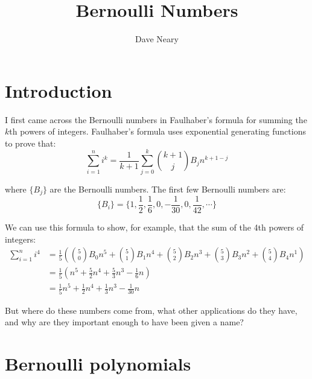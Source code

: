 \documentclass{article}
\begin{document}
\title{Bernoulli Numbers}
\author{Dave Neary}

\maketitle

\section{Introduction}

I first came across the Bernoulli numbers in Faulhaber's formula for summing the $k$th 
powers of integers. Faulhaber's formula uses exponential generating functions to prove that:
\[ \sum_{i=1}^n i^k = \frac{1}{k+1} \sum_{j=0}^k \binom{k+1}{j} B_j n^{k+1-j} \]

where $\{B_j\}$ are the Bernoulli numbers. The first few Bernoulli numbers are:
\[ \{B_i\} = \{1, \frac{1}{2}, \frac{1}{6}, 0, -\frac{1}{30}, 0, \frac{1}{42}, \cdots\} \]

We can use this formula to show, for example, that the sum of the 4th powers of integers:
\begin{align*}
	\sum_{i=1}^n i^4 &= \frac{1}{5}\left( \binom{5}{0} B_0 n^{5} +  \binom{5}{1} B_1 n^{4} +  
	\binom{5}{2} B_2 n^{3} +  \binom{5}{3} B_3 n^{2} +  \binom{5}{4} B_4 n^{1} \right) \\
			 &= \frac{1}{5}\left( n^{5} +  \frac{5}{2} n^{4} +
			 \frac{5}{3} n^{3} -  \frac{1}{6} n  \right) \\
			 &= \frac{1}{5}n^5 + \frac{1}{2}n^4 + \frac{1}{3}n^3 - \frac{1}{30}n
\end{align*}

But where do these numbers come from, what other applications do they have, and why are they
important enough to have been given a name?

\section{Bernoulli polynomials}
\end{document}
